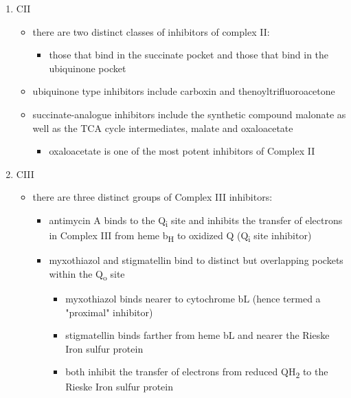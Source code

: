 \documentclass{scrartcl}
\begin{document}
\begin{enumerate}
\begin{enumerate}
\item CII
\label{sec:orgefd97bf}
\begin{itemize}
\item there are two distinct classes of inhibitors of complex II:
\begin{itemize}
\item those that bind in the succinate pocket and those that bind in the ubiquinone pocket
\end{itemize}
\item ubiquinone type inhibitors include carboxin and thenoyltrifluoroacetone
\item succinate-analogue inhibitors include the synthetic compound malonate as well as the TCA cycle intermediates, malate and oxaloacetate
\begin{itemize}
\item oxaloacetate is one of the most potent inhibitors of Complex II
\end{itemize}
\end{itemize}
\item CIII
\label{sec:orgefcfb7d}
\begin{itemize}
\item there are three distinct groups of Complex III inhibitors:
\begin{itemize}
\item antimycin A binds to the Q\textsubscript{i} site and inhibits the transfer of electrons in Complex III from heme b\textsubscript{H} to oxidized Q (Q\textsubscript{i} site inhibitor)
\item myxothiazol and stigmatellin bind to distinct but overlapping pockets within the Q\textsubscript{o} site
\begin{itemize}
\item myxothiazol binds nearer to cytochrome bL (hence termed a "proximal" inhibitor)
\item stigmatellin binds farther from heme bL and nearer the Rieske Iron sulfur protein
\item both inhibit the transfer of electrons from reduced QH\textsubscript{2} to the Rieske Iron sulfur protein
\end{itemize}
\end{itemize}
\end{itemize}


\end{enumerate}
\end{enumerate}
\end{document}
